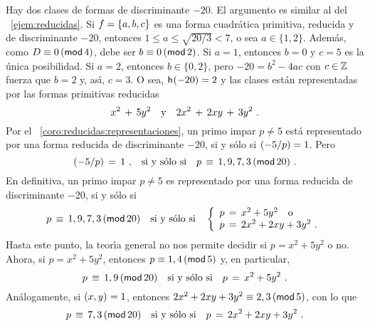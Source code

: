 \begin{ejemGeneros}\label{ejem:generos:menos-veinte}
	Hay dos clases de formas de discriminante $-20$.
	El argumento es similar al del \ejemname~\ref{ejem:reducidas}.
	Si $f=\binaria{a,b,c}$ es una forma cuadr\'atica primitiva,
	reducida y de discriminante $-20$, entonces
	$1\leq a\leq\sqrt{20/3}<7$, o sea $a\in\{1,2\}$. Adem\'as,
	como $D\equiv 0\tmodulo[4]$, debe ser $b\equiv 0\tmodulo[2]$. 
	Si $a=1$, entonces $b=0$ y $c=5$ es la \'unica posibilidad.
	Si $a=2$, entonces $b\in\{0,2\}$, pero $-20=b^2-4ac$ con
	$c\in\Enteros$ fuerza que $b=2$ y, as\'{\i}, $c=3$. O sea,
	$\nClases(-20)=2$ y las clases est\'an representadas por
	las formas primitivas reducidas
	\begin{displaymath}
		x^2\,+\,5y^2\dispand 2x^2\,+\,2xy\,+\,3y^2
		\dispstop
	\end{displaymath}
	Por el \coroname~\ref{coro:reducidas:representaciones},
	un primo impar $p\neq 5$ est\'a representado por una
	forma reducida de discriminante $-20$, si y s\'olo si
	$\tlegendre{-5} p=1$. Pero
	\begin{displaymath}
		\tlegendre{-5} p\,=\,1\dispcomma\dispiff
		p\,\equiv\,1,9,7,3\tmodulo[20]
		\dispstop
	\end{displaymath}
	En definitiva, un primo impar $p\neq 5$ es representado
	por una forma reducida de discriminante $-20$, si y s\'olo si
	\begin{displaymath}
		p\,\equiv\,1,9,7,3\tmodulo[20]
		\dispiff
		\left\{
			\begin{array}{l}
				p\,=\,x^2+5y^2\dispor \\
				p\,=\,2x^2+2xy+3y^2
				\dispstop
			\end{array}
		\right.
	\end{displaymath}
	Hasta este punto, la teor\'{\i}a general no nos permite
	decidir si $p=x^2+5y^2$ o no.
	Ahora, si $p=x^2+5y^2$, entonces $p\equiv 1,4\tmodulo[5]$ y,
	en particular,
	\begin{displaymath}
		p \,\equiv\, 1,9\tmodulo[20]
			\dispiff p\,=\,x^2+5y^2
		\dispstop
	\end{displaymath}
	An\'alogamente, si $\mcd{x,y}=1$, entonces
	$2x^2+2xy+3y^2\equiv 2,3\tmodulo[5]$, con lo que
	\begin{displaymath}
		p\,\equiv\,7,3\tmodulo[20]
			\dispiff p\,=\,2x^2+2xy+3y^2
		\dispstop
	\end{displaymath}
\end{ejemGeneros}

